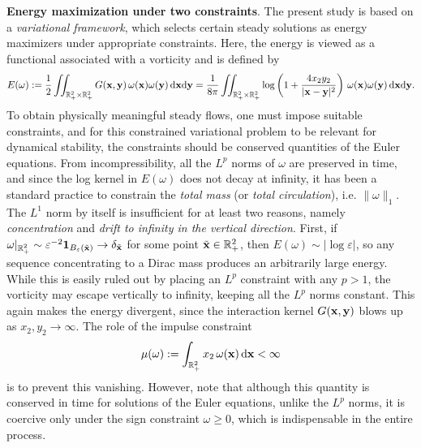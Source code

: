 \documentclass[11pt]{amsart}
\theoremstyle{definition}
\theoremstyle{definition}
\numberwithin{equation}{section}
\newcommand{\0}{\emptyset}
\newcommand{\omg}{\omega}
\newcommand{\bfx}{{\bf x}}
\newcommand{\bfy}{{\bf y}}
\newcommand{\bbR}{\mathbb R}
\newcommand{\dd}{\mathrm{d}}
\begin{document}
	\medskip
	
	\noindent \textbf{Energy maximization under two constraints}.
	The present study is based on a \textit{variational framework}, which selects certain steady solutions as energy maximizers under appropriate constraints.
	Here, the energy is viewed as a functional associated with a vorticity and is defined by
	\begin{equation*}
		\begin{split}
			E(\omg):= \frac{1}{2}\iint_{\bbR^2_+ \times \bbR^2_+}G(\bfx,\bfy)\,\omg(\bfx)\omg(\bfy)\,\dd\bfx\dd\bfy = \frac{1}{8\pi} \iint_{\bbR^2_+ \times \bbR^2_+}\log\left(1+\frac{4x_2y_2}{|\bfx-\bfy|^2}\right)\,\omg(\bfx)\omg(\bfy)\,\dd\bfx\dd\bfy. 
		\end{split}
	\end{equation*} 
	To obtain physically meaningful steady flows, one must impose suitable constraints, and for this constrained variational problem to be relevant for dynamical stability, the constraints should be conserved quantities of the Euler equations. From incompressibility, all the $L^{p}$ norms of $\omg$ are preserved in time, and since the log kernel in $E(\omg)$ does not decay at infinity, it has been a standard practice to constrain the \emph{total mass} (or \emph{total circulation}), i.e. $\|\omega\|_1$. The $L^{1}$ norm by itself is insufficient for at least two reasons, namely \textit{concentration} and \textit{drift to infinity in the vertical direction}. First, if $\omega|_{\bbR^2_+} \sim \varepsilon^{-2}\mathbf{1}_{B_{\varepsilon}(\tilde \bfx)} \to \delta_{\tilde \bfx}$ for some point $\tilde \bfx\in\mathbb{R}^2_+$, then $E(\omg)\sim |\log \varepsilon|$, so any sequence concentrating to a Dirac mass produces an arbitrarily large energy. While this is easily ruled out by placing an $L^{p}$ constraint with any $p > 1$, the vorticity may escape vertically to infinity, keeping all the $L^{p}$ norms constant. This again makes the energy divergent, since the interaction kernel $G(\bfx,\bfy)$ blows up as $x_2, y_2 \to \infty$. The role of the impulse constraint
	\[
	\mu(\omg) := \int_{\bbR^2_+} x_2\,\omega(\bfx)\,\mathrm{d}\bfx   < \infty
	\]
	is to prevent this vanishing. However, note that although this quantity is conserved in time for solutions of the Euler equations, unlike the $L^{p}$ norms, it is coercive only under the sign constraint $\omg\ge0$, which is indispensable in the entire process.
	
	\medskip
	
\end{document}
